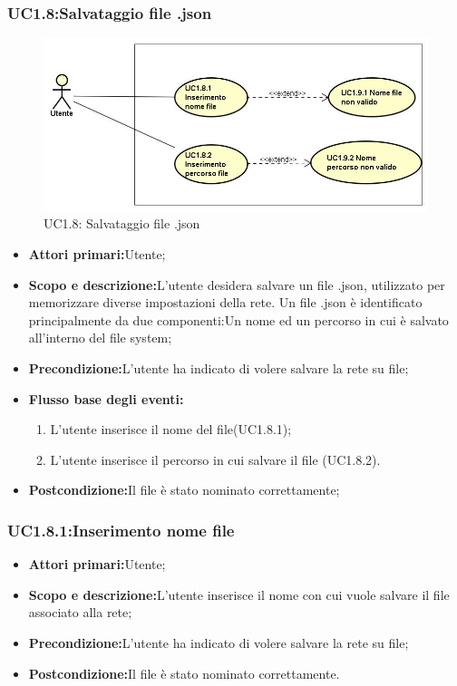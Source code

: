 \subsubsection{UC1.8:Salvataggio file .json}
\begin{figure} [H]
	\centering
	\includegraphics[scale=0.45]{Img/UC1-8}
	\caption{UC1.8: Salvataggio file .json}\label{}
\end{figure}
\begin{itemize}
	\item{\textbf{Attori primari:}Utente;}
	\item{\textbf{Scopo e descrizione:}L'utente desidera salvare un file .json, utilizzato per memorizzare diverse impostazioni della rete. Un file .json è identificato principalmente da due componenti:Un nome ed un percorso in cui è salvato all'interno del file system;}
	\item{\textbf{Precondizione:}L'utente ha indicato di volere salvare la rete su file;}
	\item{\textbf{Flusso base degli eventi:}}
	\begin{enumerate}
		\item{L'utente inserisce il nome del file(UC1.8.1);}
		\item{L'utente inserisce il percorso in cui salvare il file (UC1.8.2).}
	\end{enumerate}
	\item{\textbf{Postcondizione:}Il file è stato nominato correttamente;}
\end{itemize}
\subsubsection{UC1.8.1:Inserimento nome file}
\begin{itemize}
	\item{\textbf{Attori primari:}Utente;}
	\item{\textbf{Scopo e descrizione:}L'utente inserisce il nome con cui vuole salvare il file associato alla rete;}
	\item{\textbf{Precondizione:}L'utente ha indicato di volere salvare la rete su file;}
	\item{\textbf{Postcondizione:}Il file è stato nominato correttamente.}
\end{itemize}
